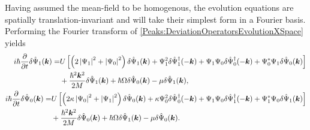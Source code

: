 Having assumed the mean-field to be homogenous, the evolution equations are spatially translation-invariant and will take their simplest form in a Fourier basis. Performing the Fourier transform of \eqref{Peaks:DeviationOperatorsEvolutionXSpace} yields
\begin{subequations}
    \label{Peaks:DeviationOperatorsEvolutionKSpace}
    \begin{align}
        \begin{split}
            i \hbar \frac{\partial }{\partial t}\delta \hat{\Psi}_1(\vect{k}) =& U\left[ \left(2\abs{\Psi_1}^2+\abs{\Psi_0}^2 \right)\delta \hat{\Psi}_1(\vect{k}) + \Psi_1^2\delta\hat{\Psi}_1^\dagger(-\vect{k}) + \Psi_1\Psi_0\delta\hat{\Psi}_0^\dagger(-\vect{k}) + \Psi_0^*\Psi_1\delta\hat{\Psi}_0(\vect{k})\right]\\
                    & +\frac{\hbar^2 \vect{k}^2}{2M} \delta \hat{\Psi}_1(\vect{k}) +\hbar \Omega\delta\hat{\Psi}_0(\vect{k})- \mu \delta \hat{\Psi}_1(\vect{k}),
        \end{split}\\
        \begin{split}
        i \hbar \frac{\partial}{\partial t} \delta \hat{\Psi}_0(\vect{k}) =& U\left[\left(2\kappa \abs{\Psi_0}^2 +\abs{\Psi_1}^2\right)\delta\hat{\Psi}_0(\vect{k}) + \kappa \Psi_0^2 \delta\hat{\Psi}_0^\dagger(-\vect{k}) + \Psi_1\Psi_0\delta\hat{\Psi}_1^\dagger(-\vect{k}) + \Psi_1^*\Psi_0\delta\hat{\Psi}_1(\vect{k})\right]\\
                    & +\frac{\hbar^2 \vect{k}^2}{2M} \delta \hat{\Psi}_0(\vect{k}) +\hbar \Omega\delta\hat{\Psi}_1(\vect{k}) - \mu \delta\hat{\Psi}_0(\vect{k}).
        \end{split}
    \end{align}
\end{subequations}

